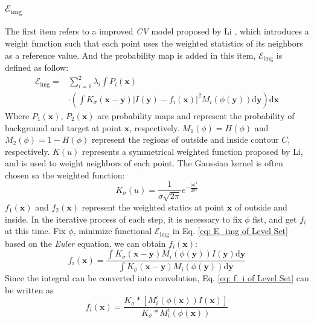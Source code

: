 \subsubsection{$\mathcal{E}_{\text{img}}$}
The first item refers to a improved \emph{CV} model proposed by Li \cite{LevelSet:mathod:li2008minimization}, which introduces a weight function such that each point uses the weighted statistics of its neighbors as a reference value. And the probability map is added in this item, $\mathcal{E}_{\text{img}}$ is defined as follow:
\begin{equation}\label{eq: E_img of Level Set}
\begin{split}
    \mathcal{E}_{\text{img}} = &\sum_{i=1}^2 \lambda_i\int P_i(\mathbf{x}) \\
    & \cdot \left( \int K_\sigma(\mathbf{x}-\mathbf{y})\left| I(\mathbf{y}) - f_i(\mathbf{x}) \right|^2 M_i(\phi(\mathbf{y}))\mathrm{d}\mathbf{y} \right)\mathrm{d}\mathbf{x}
\end{split}
\end{equation}
Where $P_1(\mathbf{x})$, $P_2(\mathbf{x})$ are probability maps and represent the probability of background and target at point $\mathbf{x}$, respectively. $M_1(\phi) = H(\phi)$ and $M_2(\phi) = 1-H(\phi)$ represent the regions of outside and inside contour $C$, respectively. $K(u)$ represents a symmetrical weighted function proposed by Li, and is used to weight neighbors of each point. The Gaussian kernel is often chosen sa the weighted function:
\begin{equation}\label{eq: gaussian sigma}
    K_\sigma(u) = \frac{1}{\sigma\sqrt{2\pi}}e^{-\frac{|u|^2}{2\sigma^2}}
\end{equation}
$f_1(\mathbf{x})$ and $f_2(\mathbf{x})$ represent the weighted statics at point $\mathbf{x}$ of outside and inside. In the iterative process of each step, it is necessary to fix $\phi$ fist, and get $f_i$ at this time. Fix $\phi$, minimize functional $\mathcal{E}_{\text{img}}$ in Eq. \ref{eq: E_img of Level Set} based on the \emph{Euler} equation, we can obtain $f_i(\mathbf{x})$:
\begin{equation}\label{eq: f_i of Level Set}
    f_i(\mathbf{x}) = \frac{\int K_\sigma(\mathbf{x}-\mathbf{y})M_i(\phi(\mathbf{y}))I(\mathbf{y})\mathrm{d}\mathbf{y}}
    {\int K_\sigma(\mathbf{x}-\mathbf{y})M_i(\phi(\mathbf{y}))\mathrm{d}\mathbf{y}}
\end{equation}
Since the integral can be converted into convolution, Eq. \ref{eq: f_i of Level Set} can be written as
\begin{equation*}
    f_i(\mathbf{x}) =
    \frac{K_\sigma \ast \left[ M_i^\epsilon(\phi(\mathbf{x})) I(\mathbf{x}) \right] }
    {K_\sigma \ast M_i^\epsilon(\phi(\mathbf{x}))}
\end{equation*}
